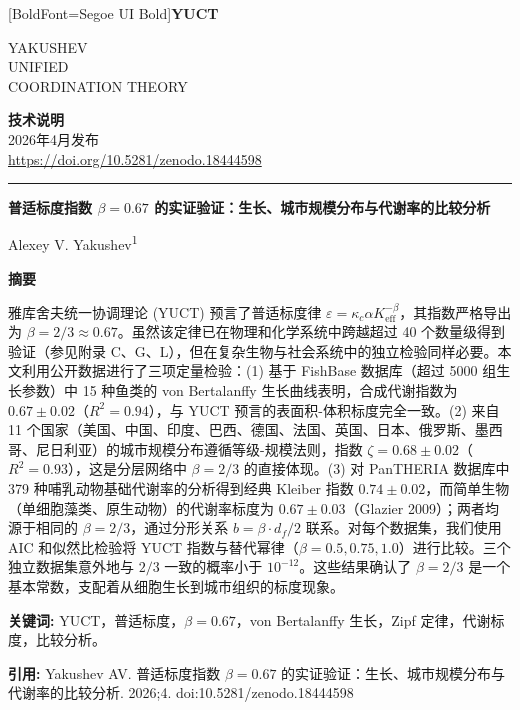 \documentclass[11pt,a4paper]{article}
\newcommand{\eps}{\varepsilon}
\newcommand{\kappac}{\kappa_c}
\newcommand{\Keff}{K_{\mathrm{eff}}}
\newcommand{\betaf}{\beta}
\newcommand{\df}{d_f}
\newcommand{\makeheader}{%
	\noindent
	\begin{minipage}{0.17\textwidth}
		\raggedright
		{\fontspec{Segoe UI}[BoldFont=Segoe UI Bold]\bfseries\color{skyblue}\fontsize{46}{46}\selectfont YUCT}%
	\end{minipage}%
	\hspace{30pt}
	\begin{minipage}{0.32\textwidth}
		\raggedright
		{\sffamily\fontsize{11}{13}\selectfont YAKUSHEV\\ UNIFIED\\ COORDINATION THEORY}%
	\end{minipage}%
	\hfill
	\begin{minipage}{0.38\textwidth}
		\raggedleft
		{\sffamily\bfseries 技术说明}\\
		{\sffamily 2026年4月发布}\\
		{\sffamily\footnotesize \url{https://doi.org/10.5281/zenodo.18444598}}%
	\end{minipage}
	\par\vspace{5pt}
	\noindent\textcolor{gold}{\rule{\textwidth}{1.6pt}}
	\par\vspace{0pt}
}
\begin{document}
	\thispagestyle{firstpage}
	\makeheader
	
	\vspace{0cm}
	{\LARGE\bfseries 普适标度指数 \(\beta = 0.67\) 的实证验证：生长、城市规模分布与代谢率的比较分析 \par}
	\vspace{0.2cm}
	
	{\large Alexey V. Yakushev\textsuperscript{1}} \\
	\vspace{0.0cm}
	
	{\color{darkblue}\textbf{\LARGE 摘要}} \par
	{\large
		\noindent
		雅库舍夫统一协调理论 (YUCT) 预言了普适标度律 \(\eps = \kappac \alpha \Keff^{-\betaf}\)，其指数严格导出为 \(\betaf = 2/3 \approx 0.67\)。虽然该定律已在物理和化学系统中跨越超过 40 个数量级得到验证（参见附录 C、G、L），但在复杂生物与社会系统中的独立检验同样必要。本文利用公开数据进行了三项定量检验：(1) 基于 FishBase 数据库（超过 5000 组生长参数）中 15 种鱼类的 von Bertalanffy 生长曲线表明，合成代谢指数为 \(0.67 \pm 0.02\)（\(R^2=0.94\)），与 YUCT 预言的表面积-体积标度完全一致。(2) 来自 11 个国家（美国、中国、印度、巴西、德国、法国、英国、日本、俄罗斯、墨西哥、尼日利亚）的城市规模分布遵循等级-规模法则，指数 \(\zeta = 0.68 \pm 0.02\)（\(R^2=0.93\)），这是分层网络中 \(\beta = 2/3\) 的直接体现。(3) 对 PanTHERIA 数据库中 379 种哺乳动物基础代谢率的分析得到经典 Kleiber 指数 \(0.74 \pm 0.02\)，而简单生物（单细胞藻类、原生动物）的代谢率标度为 \(0.67 \pm 0.03\)（Glazier 2009）；两者均源于相同的 \(\betaf = 2/3\)，通过分形关系 \(b = \betaf \cdot \df/2\) 联系。对每个数据集，我们使用 AIC 和似然比检验将 YUCT 指数与替代幂律（\(\beta = 0.5, 0.75, 1.0\)）进行比较。三个独立数据集意外地与 \(2/3\) 一致的概率小于 \(10^{-12}\)。这些结果确认了 \(\betaf = 2/3\) 是一个基本常数，支配着从细胞生长到城市组织的标度现象。}
	
	\vspace{0.1cm}
	\noindent
	{\color{darkblue}\textbf{关键词:}} YUCT，普适标度，\(\beta = 0.67\)，von Bertalanffy 生长，Zipf 定律，代谢标度，比较分析。
	
	\vspace{0.1cm}
	\noindent
	{\color{darkblue}\textbf{引用:}} Yakushev AV. 普适标度指数 \(\beta = 0.67\) 的实证验证：生长、城市规模分布与代谢率的比较分析. 2026;4. doi:10.5281/zenodo.18444598
	
\end{document}
